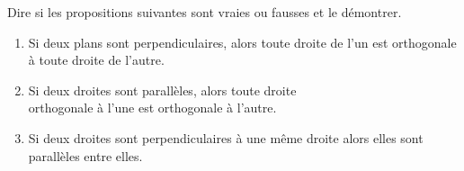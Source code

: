 \documentclass{cornouaille}
\begin{document}
  \begin{exercice}
    Dire si les propositions suivantes sont vraies ou fausses et le
    démontrer.
    \begin{enumerate}
    \item Si deux plans sont perpendiculaires, alors toute droite de
      l'un est orthogonale à toute droite de l'autre.
    \item Si deux droites sont parallèles, alors toute droite\\
      orthogonale à l'une est orthogonale à l'autre.
    \item Si deux droites sont perpendiculaires à une même droite
      alors elles sont parallèles entre elles.
    \end{enumerate}
  \end{exercice}
\end{document}
